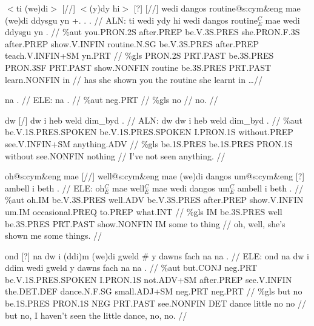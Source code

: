 \documentclass[a4paper,10pt]{article}
\begin{document}
\ex
\begingl[lingstyle=gergl]
\glchat $<$ti (we)di$>$ [//] $<$(y)dy hi$>$ [?] [//] wedi dangos routine@s:cym\&eng mae (we)di ddysgu yn +. . . //
\glsurface ALN:  ti wedi ydy hi wedi dangos routine$^{C}_{E}$ mae wedi ddysgu yn .  //
\glauto \%aut  you{\scriptsize .PRON.2S} after{\scriptsize .PREP} be{\scriptsize .V.3S.PRES} she{\scriptsize .PRON.F.3S} after{\scriptsize .PREP} show{\scriptsize .V.INFIN} routine{\scriptsize .N.SG} be{\scriptsize .V.3S.PRES} after{\scriptsize .PREP} teach{\scriptsize .V.INFIN+SM} yn{\scriptsize .PRT}   //
\glmanual \%gls  PRON{\scriptsize .2S} PRT{\scriptsize .PAST} be{\scriptsize .3S.PRES} PRON{\scriptsize .3SF} PRT{\scriptsize .PAST} show{\scriptsize .NONFIN} routine be{\scriptsize .3S.PRES} PRT{\scriptsize .PAST} learn{\scriptsize .NONFIN} in   //
\gleng has she shown you the routine she learnt in \dots  //
\endgl
\xe

\ex
\begingl[lingstyle=gergl]
\glchat na . //
\glsurface ELE:  na .  //
\glauto \%aut  neg{\scriptsize .PRT}   //
\glmanual \%gls  no   //
\gleng no. //
\endgl
\xe

\ex
\begingl[lingstyle=gergl]
\glchat dw [/] dw i heb weld dim\_byd . //
\glsurface ALN:  dw dw i heb weld dim\_byd .  //
\glauto \%aut  be{\scriptsize .V.1S.PRES.SPOKEN} be{\scriptsize .V.1S.PRES.SPOKEN} I{\scriptsize .PRON.1S} without{\scriptsize .PREP} see{\scriptsize .V.INFIN+SM} anything{\scriptsize .ADV}   //
\glmanual \%gls  be{\scriptsize .1S.PRES} be{\scriptsize .1S.PRES} PRON{\scriptsize .1S} without see{\scriptsize .NONFIN} nothing   //
\gleng I've not seen anything. //
\endgl
\xe

\ex
\begingl[lingstyle=gergl]
\glchat oh@s:cym\&eng mae [//] well@s:cym\&eng mae (we)di dangos um@s:cym\&eng [?] ambell i beth . //
\glsurface ELE:  oh$^{C}_{E}$ mae well$^{C}_{E}$ mae wedi dangos um$^{C}_{E}$ ambell i beth .  //
\glauto \%aut  oh{\scriptsize .IM} be{\scriptsize .V.3S.PRES} well{\scriptsize .ADV} be{\scriptsize .V.3S.PRES} after{\scriptsize .PREP} show{\scriptsize .V.INFIN} um{\scriptsize .IM} occasional{\scriptsize .PREQ} to{\scriptsize .PREP} what{\scriptsize .INT}   //
\glmanual \%gls  IM be{\scriptsize .3S.PRES} well be{\scriptsize .3S.PRES} PRT{\scriptsize .PAST} show{\scriptsize .NONFIN} IM some to thing   //
\gleng oh, well, she's shown me some things. //
\endgl
\xe

\ex
\begingl[lingstyle=gergl]
\glchat ond [?] na dw i (ddi)m (we)di gweld \# y dawns fach na na . //
\glsurface ELE:  ond na dw i ddim wedi gweld y dawns fach na na .  //
\glauto \%aut  but{\scriptsize .CONJ} neg{\scriptsize .PRT} be{\scriptsize .V.1S.PRES.SPOKEN} I{\scriptsize .PRON.1S} not{\scriptsize .ADV+SM} after{\scriptsize .PREP} see{\scriptsize .V.INFIN} the{\scriptsize .DET.DEF} dance{\scriptsize .N.F.SG} small{\scriptsize .ADJ+SM} neg{\scriptsize .PRT} neg{\scriptsize .PRT}   //
\glmanual \%gls  but no be{\scriptsize .1S.PRES} PRON{\scriptsize .1S} NEG PRT{\scriptsize .PAST} see{\scriptsize .NONFIN} DET dance little no no   //
\gleng but no, I haven't seen the little dance, no, no. //
\endgl
\xe
\end{document}
